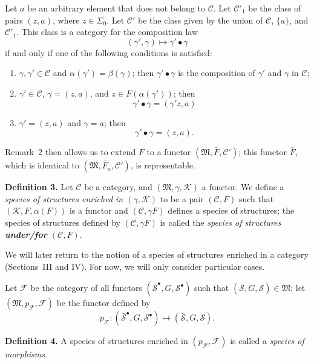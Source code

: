 \documentclass[fleqn]{article}
\newenvironment{rmenv}[1]
  {\phantomsection\par\medskip\noindent\textbf{#1.}\rmfamily}
  {\par\medskip}
\newcommand{\unsure}[1]{{\color{purple}\textbf{#1}}}
\newcommand{\CC}{\mathcal{C}}
\renewcommand{\SS}{\mathcal{S}}
\newcommand{\MM}{\mathfrak{M}}
\newcommand{\KK}{\mathcal{K}}
\newcommand{\FF}{\mathcal{F}}
\begin{document}
Let $a$ be an arbitrary element that does not belong to $\CC$.
Let $\CC'_1$ be the class of pairs $(z,a)$, where $z\in\Sigma_0$.
Let $\CC'$ be the class given by the union of $\CC$, $\{a\}$, and $\CC'_1$.
This class is a category for the composition law
\[
  (\gamma',\gamma)
  \longmapsto\gamma'\bullet\gamma
\]
if and only if one of the following conditions is satisfied:
\begin{enumerate}
  \item[1.]
    $\gamma,\gamma'\in\CC$ and $\alpha(\gamma')=\beta(\gamma)$;
    then $\gamma'\bullet\gamma$ is the composition of $\gamma'$ and $\gamma$ in $\CC$;
  \item[2.]
    $\gamma'\in\CC$, $\gamma=(z,a)$, and $z\in F(\alpha(\gamma'))$;
    then
    \[
      \gamma'\bullet\gamma
      =(\gamma'z,a)
    \]
  \item[3.]
    $\gamma'=(z,a)$ and $\gamma=a$;
    then
    \[
      \gamma'\bullet\gamma
      =(z,a).
    \]
\end{enumerate}
Remark~2 then allows us to extend $F$ to a functor $(\MM,\bar{F},\CC')$;
this functor $\bar{F}$, which is identical to $(\MM,\bar{F}_a,\CC')$, is representable.

\begin{rmenv}{Definition 3}
  Let $\CC$ be a category, and $(\MM,\gamma,\KK)$ a functor.
  We define a \emph{species of structures enriched in $(\gamma,\KK)$} to be a pair $(\CC,F)$ such that $(\KK,F,\alpha(F))$ is a functor and $(\CC,\gamma F)$ defines a species of structures;
  the species of structures defined by $(\CC,\gamma F)$ is called the \emph{species of structures \unsure{under/for} $(\CC,F)$}.
\end{rmenv}

We will later return to the notion of a species of structures enriched in a category (Sections~III and IV).
For now, we will only consider particular cases.

Let $\FF$ be the category of all functors $(\bar{\SS}^\bullet,G,\SS^\bullet)$ such that $(\bar{\SS},G,\SS)\in\MM$;
let $(\MM,p_\FF,\FF)$ be the functor defined by
\[
  p_\FF\colon(\bar{\SS}^\bullet,G,\SS^\bullet)
  \longmapsto (\bar{\SS},G,\SS).
\]

\begin{rmenv}{Definition 4}
  A species of structures enriched in $(p_\FF,\FF)$ is called a \emph{species of morphisms}.
\end{rmenv}
\end{document}
